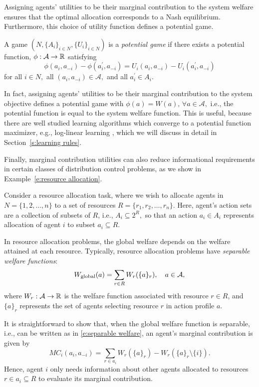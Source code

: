Assigning agents' utilities to be their marginal contribution to the system welfare ensures that the optimal allocation corresponds to a Nash equilibrium. Furthermore, this choice of utility function defines a potential game.

\begin{defn}
A game $(N,\{A_i\}_{i\in N}, \{U_i\}_{i\in N})$ is a {\it potential game}\cite{Monderer1996} if there exists a potential function, $\phi:\mathcal{A}\to \mathbb{R}$ satisfying
$$\phi(a_i,a_{-i}) - \phi(a_i^\prime,a_{-i}) = U_i(a_i,a_{-i}) - U_i(a_i^\prime,a_{-i})$$
for all $i\in N,$ all $(a_i,a_{-i})\in \mathcal{A},$ and all $a_i^\prime\in A_i.$
\end{defn}

In fact, assigning agents' utilities to be their marginal contribution to the system objective defines a potential game with $\phi(a) = W(a),\,\forall a\in \mathcal{A},$ i.e., the potential function is equal to the system welfare function. This is useful, because there are well studied learning algorithms which converge to a potential function maximizer, e.g., log-linear learning \cite{Blume1993}, which we will discuss in detail in Section~\ref{s:learning rules}. 


Finally, marginal contribution utilities can also reduce informational requirements in certain classes of distribution control problems, as we show in  Example~\ref{e:resource allocation}.

\begin{example}\label{e:resource allocation}
Consider a resource allocation task, where we wish to allocate agents in $N = \{1,2,\ldots, n\}$ to a set of resources $R = \{r_1,r_2,\ldots,r_n\}$. Here, agent's action sets are a collection of subsets of $R$, i.e., $A_i\subseteq 2^R,$ so that an action $a_i\in A_i$ represents allocation of agent $i$ to subset $a_i\subseteq R.$

In resource allocation problems, the global welfare depends on the welfare attained at each resource. Typically, resource allocation problems have {\it separable welfare functions}:
\begin{equation}\label{e:separable welfare}W_{\rm global}(a) = \sum_{r\in R} W_r(\{a\}_r),\quad a\in\mathcal{A},\end{equation}
where $W_r:\mathcal{A}\to\mathbb{R}$ is the welfare function associated with resource $r\in R$, and $\{a\}_r$ represents the set of agents selecting resource $r$ in action profile $a$. 

It is straightforward to show that, when the global welfare function is separable, i.e., can be written as in \eqref{e:separable welfare}, an agent's marginal contribution is given by
$$MC_i(a_i,a_{-i}) = \sum_{r\in a_i}W_r\left(\{a\}_r\right) - W_r\left(\{a\}_r\setminus\{i\}\right).$$
Hence, agent $i$ only needs information about other agents allocated to resources $r\in a_i\subseteq R$ to evaluate its marginal contribution.
\end{example}


